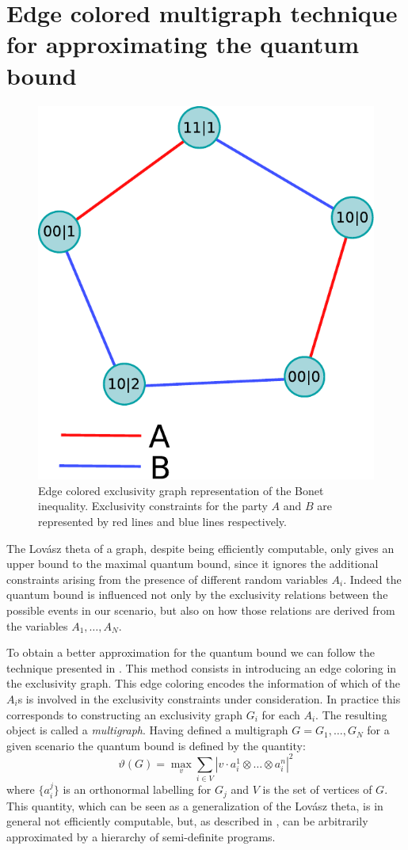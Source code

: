 \documentclass[letterpaper]{article}
\begin{document}
\section*{Edge colored multigraph technique for approximating the quantum
bound}
\begin{figure}[t]
    \centering
    \includegraphics[width=.7\columnwidth]{images/instrumental_multigraph.pdf}
    \caption{Edge colored exclusivity graph representation of the Bonet
        inequality. Exclusivity constraints for the party $A$ and $B$ are
    represented by red lines and blue lines respectively.}
    \label{fig:instrumental_multigraph}
\end{figure}

The Lov\'asz theta of a graph, despite being efficiently computable,
only gives an upper bound to the maximal quantum bound, since it ignores
the additional constraints arising from the presence of different random
variables $A_i$.
Indeed the quantum bound is influenced not only by the exclusivity relations between the
possible events in our scenario, but also on how those relations are derived from the
variables $A_1,\ldots,A_N$.

To obtain a better approximation for the quantum bound we can follow
the technique presented in \cite{rabelo2014}.
This method consists in introducing an edge coloring in the exclusivity graph. 
This edge coloring encodes the information of which of the $A_i$s is involved in the exclusivity constraints under consideration.
In practice this corresponds to constructing an exclusivity graph $G_i$ for each
$A_i$. The resulting object is called a \emph{multigraph}. 
Having defined a multigraph $G = {G_1, \ldots, G_N}$ for a given scenario the
quantum bound is defined by the quantity:
\begin{equation}
    \vartheta(G) = \max_{v} \sum_{i \in V} |v \cdot a^1_i \otimes \dots \otimes a^n_i|^2
    \label{eq:multigraph_lovazs}
\end{equation}
where $\{a^j_i\}$ is an orthonormal labelling for $G_j$ and $V$ is the set
of vertices of $G$. This quantity, which can be seen as a generalization
of the Lov\'asz theta, is in general not efficiently computable, but,
as described in \cite{rabelo2014}, can be arbitrarily approximated by
a hierarchy of semi-definite programs\cite{npa2008}.
\end{document}
